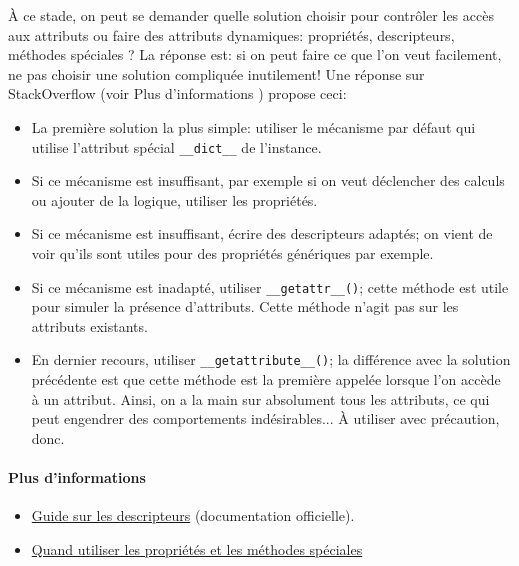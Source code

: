 À ce stade, on peut se demander quelle solution choisir pour contrôler les accès aux attributs ou faire des attributs dynamiques: propriétés, descripteurs, méthodes spéciales ? La réponse est: si on peut faire ce que l'on veut facilement, ne pas choisir une solution compliquée inutilement! Une réponse sur StackOverflow (voir \og Plus d'informations \fg{}) propose ceci:
\begin{itemize}
    \item La première solution la plus simple: utiliser le mécanisme par défaut qui utilise l'attribut spécial \texttt{__dict__} de l'instance.
    \item Si ce mécanisme est insuffisant, par exemple si on veut déclencher des calculs ou ajouter de la logique, utiliser les propriétés.
    \item Si ce mécanisme est insuffisant, écrire des descripteurs adaptés; on vient de voir qu'ils sont utiles pour des propriétés génériques par exemple.
    \item Si ce mécanisme est inadapté, utiliser \texttt{__getattr__()}; cette méthode est utile pour simuler
    la présence d'attributs. Cette méthode n'agit pas sur les attributs existants.
    \item En dernier recours, utiliser \texttt{__getattribute__()}; la différence avec la solution précédente est
    que cette méthode est la première appelée lorsque l'on accède à un attribut. Ainsi, on a la main sur absolument tous les
    attributs, ce qui peut engendrer des comportements indésirables... À utiliser avec précaution, donc.
\end{itemize}

\paragraph{Plus d'informations} \begin{itemize}
    \item \href{https://docs.python.org/fr/3/howto/descriptor.html}{Guide sur les descripteurs} (documentation officielle).
    \item \href{https://stackoverflow.com/a/22617259/9214306}{Quand utiliser les propriétés et les méthodes spéciales}
\end{itemize}
